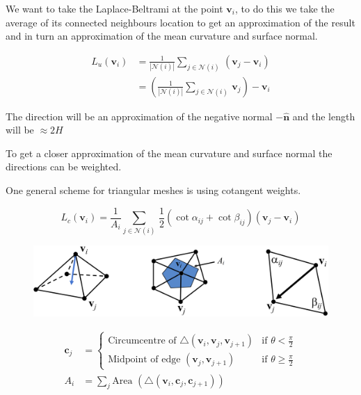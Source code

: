 \documentclass{article}
\begin{document}
We want to take the Laplace-Beltrami at the point \(\mathbf{v}_{i}\), to do this we take the average of its
connected neighbours location to get an approximation of the result and in turn an approximation of the mean
curvature and surface normal.

\begin{align*}
    L_{u}(\mathbf{v}_{i}) &= \frac{1}{|\mathcal{N}(i)|} \sum_{j \in \mathcal{N}(i)} \, (\mathbf{v}_{j} - \mathbf{v}_{i})\\
    &= \left(\frac{1}{|\mathcal{N}(i)|} \sum_{j \in \mathcal{N}(i)} \, \mathbf{v}_{j} \right) - \mathbf{v}_{i}
\end{align*}

The direction will be an approximation of the negative normal \(-\mathbf{\hat{n}}\) and the length will be \(\approx 2H\) 

\vspace{5px}

To get a closer approximation of the mean curvature and surface normal the directions can be weighted.

One general scheme for triangular meshes is using cotangent weights.

\[
    L_{c}(\mathbf{v}_{i}) = \frac{1}{A_{i}} \sum_{j \in \mathcal{N}(i)} \, \frac{1}{2} (\cot \alpha_{ij} + \cot \beta_{ij}) (\mathbf{v}_{j} - \mathbf{v}_{i})
\]

\begin{figure}[!ht]
    \centering
    \includegraphics[width=0.7\linewidth]{images/cotangent_weighting.png}
\end{figure}

\begin{align*}
    \mathbf{c}_{j} &= 
    \begin{cases}
        \text{Circumcentre of } \triangle (\mathbf{v}_{i}, \mathbf{v}_{j}, \mathbf{v}_{j+1}) & \text{if  } \theta < \frac{\pi}{2}\\
        \text{Midpoint of edge } (\mathbf{v}_{j}, \mathbf{v}_{j+1}) & \text{if  } \theta \geq \frac{\pi}{2}
    \end{cases}\\[5px]
    A_{i} &= \sum_{j} \text{Area } (\triangle (\mathbf{v}_{i}, \mathbf{c}_{j}, \mathbf{c}_{j+1}))
\end{align*}
\end{document}
